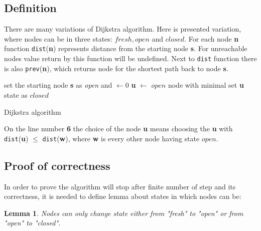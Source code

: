 \documentclass[thesis=M,english]{FITthesis}[2012/10/20]
\newtheorem{lemma}{Lemma}
\begin{document}
 \subsection{Definition}
There are many variations of Dijkstra algorithm. Here is presented variation, where nodes can be in three states: $fresh, open $ and $closed$. For each node \textbf{n} function \texttt{dist}(\textbf{n}) represents distance from the starting node \textbf{s}. For unreachable nodes value return by this function will be undefined. Next to \texttt{dist} function there is also \texttt{prev}(\textbf{n}), which returns node for the shortest path back to node \textbf{s}.

\begin{algorithm}[H]
 set the starting node \textbf{s} as \textit{open} and $ \leftarrow 0$\;
 {
  \textbf{u} $\leftarrow$ $open$ node with minimal  \;
  set \textbf{u} state as $closed$	\;
  {
  } 
 }
\caption{Dijkstra algorithm}\label{algo_dijkstra}
\end{algorithm}

On the line number \textbf{6} the choice of the node \textbf{u} means choosing the \textbf{u} with \texttt{dist}(\textbf{u}) $ \leq $ \texttt{dist}(\textbf{w}), where \textbf{w} is every other node having state $open$.

\subsection{Proof of correctness}

In order to prove the algorithm will stop after finite number of step and its correctness, it is needed to define lemma about states in which nodes can be:

\begin{lemma}
Nodes can only change state either from "\textit{fresh}" to "\textit{open}" or from "\textit{open}" to "\textit{closed}".
\end{lemma}
\end{document}
